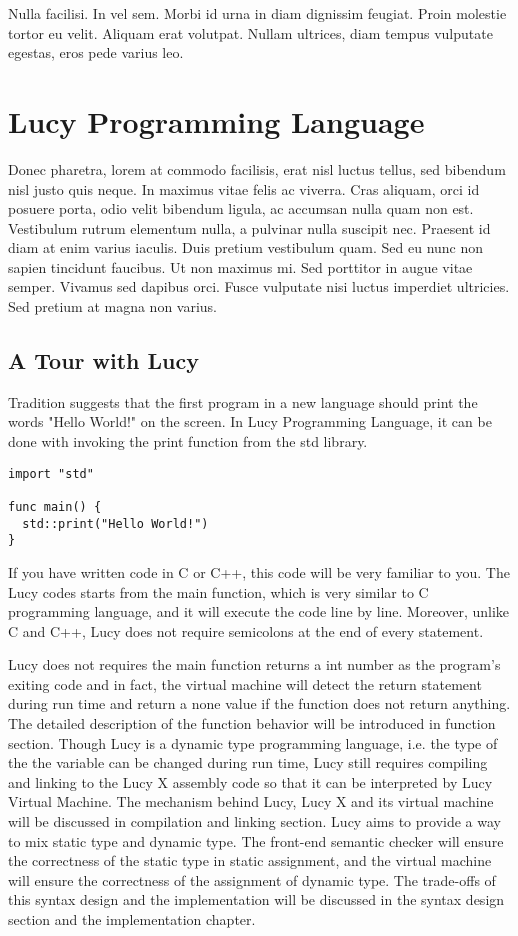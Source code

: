 \begin{savequote}[75mm]
Nulla facilisi. In vel sem. Morbi id urna in diam dignissim feugiat. Proin molestie tortor eu velit. Aliquam erat volutpat. Nullam ultrices, diam tempus vulputate egestas, eros pede varius leo.
\end{savequote}

\chapter{Lucy Programming Language}
Donec pharetra, lorem at commodo facilisis, erat nisl luctus tellus, sed bibendum nisl justo quis neque. In maximus vitae felis ac viverra. Cras aliquam, orci id posuere porta, odio velit bibendum ligula, ac accumsan nulla quam non est. Vestibulum rutrum elementum nulla, a pulvinar nulla suscipit nec. Praesent id diam at enim varius iaculis. Duis pretium vestibulum quam. Sed eu nunc non sapien tincidunt faucibus. Ut non maximus mi. Sed porttitor in augue vitae semper. Vivamus sed dapibus orci. Fusce vulputate nisi luctus imperdiet ultricies. Sed pretium at magna non varius.


\section{A Tour with Lucy}
Tradition suggests that the first program in a new language should print the words "Hello World!" on the screen. In Lucy Programming Language, it can be done with invoking the print function from the std library.
\begin{lstlisting}
import "std"

func main() {
  std::print("Hello World!")
}
\end{lstlisting}
If you have written code in C or C++, this code will be very familiar to you. The Lucy codes starts from the main function, which is very similar to C programming language, and it will execute the code line by line. Moreover, unlike C and C++, Lucy does not require semicolons at the end of every statement.

Lucy does not requires the main function returns a int number as the program's exiting code and in fact, the virtual machine will detect the return statement during run time and return a none value if the function does not return anything. The detailed description of the function behavior will be introduced in function section. Though Lucy is a dynamic type programming language, i.e. the type of the the variable can be changed during run time, Lucy still requires compiling and linking to the Lucy X assembly code so that it can be interpreted by Lucy Virtual Machine. The mechanism behind Lucy, Lucy X and its virtual machine will be discussed in compilation and linking section. Lucy aims to provide a way to mix static type and dynamic type. The front-end semantic checker will ensure the correctness of the static type in static assignment, and the virtual machine will ensure the correctness of the assignment of dynamic type. The trade-offs of this syntax design and the implementation will be discussed in the syntax design section and the implementation chapter.

